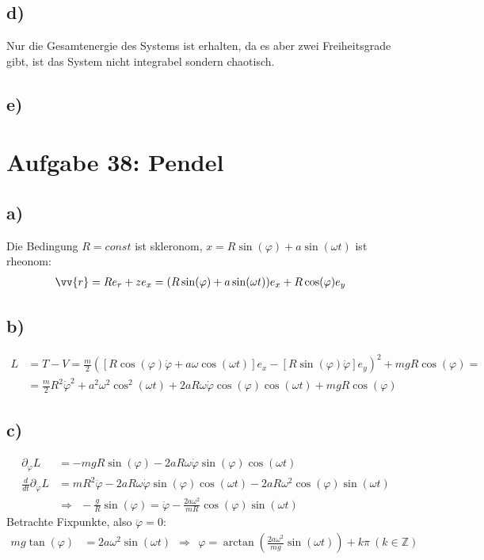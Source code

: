\documentclass[a4paper,12pt]{article}
\begin{document}
\subsection*{d)} Nur die Gesamtenergie des Systems ist erhalten, da es aber zwei Freiheitsgrade gibt, ist das System nicht integrabel sondern chaotisch.
\subsection*{e)} 
\section*{Aufgabe 38: Pendel}
\subsection*{a)} Die Bedingung $R=const$ ist skleronom, $x=R\sin(\varphi)+a\sin(\omega t)$ ist rheonom:
\begin{align*}
\vv{r}&=Re_r+ze_x=(R\sin(\varphi)+a\sin(\omega t))e_x+R\cos(\varphi)e_y
\end{align*}
\subsection*{b)}
\begin{align*}
L&=T-V=\frac{m}{2}([R\cos(\varphi)\dot{\varphi}+a\omega\cos(\omega t)]e_x-[R\sin(\varphi)\dot{\varphi}]e_y)^2+mgR\cos(\varphi)= \\
&=\frac{m}{2}R^2\dot{\varphi}^2+a^2\omega^2\cos^2(\omega t)+2aR\omega \dot{\varphi}\cos(\varphi)\cos(\omega t)+mgR\cos(\varphi)
\end{align*}
\subsection*{c)}
\begin{align*}
\partial_{\varphi}L&=-mgR\sin(\varphi)-2aR\omega\dot{\varphi}\sin(\varphi)\cos(\omega t)\\
\frac{d}{dt}\partial_{\dot{\varphi}}L&=mR^2\ddot{\varphi}-2aR\omega\dot{\varphi}\sin(\varphi)\cos(\omega t)-2aR\omega^2\cos(\varphi)\sin(\omega t) \\
&\Rightarrow\ \ -\frac{g}{R}\sin(\varphi)=\ddot{\varphi}-\frac{2a\omega^2}{mR}\cos(\varphi)\sin(\omega t)
\end{align*}
Betrachte Fixpunkte, also $\ddot{\varphi}=0$:
\begin{align*}
mg\tan(\varphi)&=2a\omega^2\sin(\omega t)\ \ \Rightarrow\ \ \varphi =\arctan\left(\frac{2a\omega^2}{mg}\sin(\omega t)\right)+k\pi\ (k\in\mathbb{Z})
\end{align*}
\end{document}
